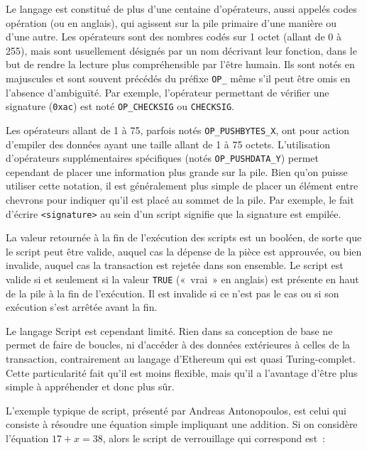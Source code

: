 Le langage est constitué de plus d'une centaine d'opérateurs, aussi appelés codes opération (ou  en anglais), qui agissent sur la pile primaire d'une manière ou d'une autre. Les opérateurs sont des nombres codés sur 1 octet (allant de 0 à 255), mais sont usuellement désignés par un nom décrivant leur fonction, dans le but de rendre la lecture plus compréhensible par l'être humain. Ils sont notés en majuscules et sont souvent précédés du préfixe \texttt{OP\_} même s'il peut être omis en l'absence d'ambiguïté. Par exemple, l'opérateur permettant de vérifier une signature (\texttt{0xac}) est noté \texttt{OP\_CHECKSIG} ou \texttt{CHECKSIG}.

Les opérateurs allant de 1 à 75, parfois notés \texttt{OP\_PUSHBYTES\_X}, ont pour action d'empiler des données ayant une taille allant de 1 à 75 octets. L'utilisation d'opérateurs supplémentaires spécifiques (notés \texttt{OP\_PUSHDATA\_Y}) permet cependant de placer une information plus grande sur la pile. Bien qu'on puisse utiliser cette notation, il est généralement plus simple de placer un élément entre chevrons pour indiquer qu'il est placé au sommet de la pile. Par exemple, le fait d'écrire \texttt{<signature>} au sein d'un script signifie que la signature est empilée.

La valeur retournée à la fin de l'exécution des scripts est un booléen, de sorte que le script peut être valide, auquel cas la dépense de la pièce est approuvée, ou bien invalide, auquel cas la transaction est rejetée dans son ensemble. Le script est valide si et seulement si la valeur \texttt{TRUE} («~vrai~» en anglais) est présente en haut de la pile à la fin de l'exécution. Il est invalide si ce n'est pas le cas ou si son exécution s'est arrêtée avant la fin.

Le langage Script est cependant limité. Rien dans sa conception de base ne permet de faire de boucles, ni d'accéder à des données extérieures à celles de la transaction, contrairement au langage d'Ethereum qui est quasi Turing-complet. Cette particularité fait qu'il est moins flexible, mais qu'il a l'avantage d'être plus simple à appréhender et donc plus sûr.

L'exemple typique de script, présenté par Andreas Antonopoulos, est celui qui consiste à résoudre une équation simple impliquant une addition. Si on considère l'équation $17 + x = 38$, alors le script de verrouillage qui correspond est~:

